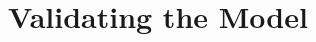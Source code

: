 \documentclass[../mcmpaper]{subfiles}
\begin{document}
	\section{Validating the Model}
	\lipsum[9]
\end{document}
